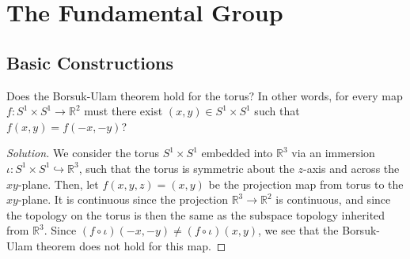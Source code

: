 \documentclass[12pt]{article}
\theoremstyle{remark}
\begin{document}
\section{The Fundamental Group}
\subsection{Basic Constructions}
\setcounter{subsubsection}{7}
\begin{problem}
  Does the Borsuk-Ulam theorem hold for the torus? In other words, for every map $f\colon S^1 \times S^1 \to \mathbb{R}^2$ must there exist $(x,y) \in S^1 \times S^1$ such that $f(x,y) = f(-x,-y)$?
\end{problem}
\begin{proof}[Solution]
  We consider the torus $S^1 \times S^1$ embedded into $\mathbb{R}^3$ via an
  immersion $\iota\colon S^1 \times S^1 \hookrightarrow \mathbb{R}^3$, such that
  the torus is symmetric about the $z$-axis and across the $xy$-plane. Then, let
  $f(x,y,z) = (x,y)$ be the projection map from torus to the $xy$-plane. It is
  continuous since the projection $\mathbb{R}^3 \to \mathbb{R}^2$ is continuous,
  and since the topology on the torus is then the same as the subspace topology
  inherited from $\mathbb{R}^3$. Since $(f \circ \iota)(-x,-y) \ne
  (f \circ \iota)(x,y)$, we see that the Borsuk-Ulam theorem does not hold for this
  map.
\end{proof}
\end{document}
